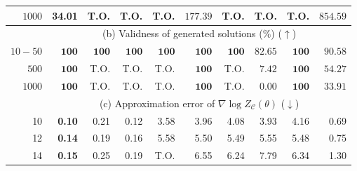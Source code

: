 \begin{table}[!t]
\begin{tabular}{r|rrrrrrrrr}
        $1000$  & \textbf{34.01}                                                                                      & T.O.           & {T.O.}         & {T.O.}         & $177.39$       & {T.O.}         & {T.O.}       & {T.O.}         & $854.59$ \\
        \hline
                & \multicolumn{9}{c}{(b) Validness of generated solutions ($\%$) ($\uparrow$)}                                                                                                                                                        \\ \hline
        $10-50$ & $\mathbf{100}$                                                                                      & $\mathbf{100}$ & $\mathbf{100}$ & $\mathbf{100}$ & $\mathbf{100}$ & $\mathbf{100}$ & $82.65$      & $\mathbf{100}$ & $90.58$  \\
        $500$   & $\mathbf{100}$                                                                                      & T.O.           & T.O.           & T.O.           & $\mathbf{100}$ & T.O.           & $7.42$       & $\mathbf{100}$ & $54.27$  \\
        $1000$  & $\mathbf{100}$                                                                                      & T.O.           & T.O.           & T.O.           & $\mathbf{100}$ & T.O.           & $0.00$       & $\mathbf{100}$ & $33.91$  \\
        \hline
                & \multicolumn{9}{c}{(c) Approximation error of  $\nabla\log Z_{\mathcal{C}}(\theta)$ ($\downarrow$)}                                                                                                                                 \\ \hline
        10      & \textbf{0.10}                                                                                       & 0.21           & 0.12           & 3.58           & 3.96           & 4.08           & 3.93         & 4.16           & 0.69     \\
        12      & \textbf{0.14}                                                                                       & 0.19           & 0.16           & 5.58           & 5.50           & 5.49           & 5.55         & 5.48           & 0.75     \\
        14      & \textbf{0.15}                                                                                       & 0.25           & 0.19           & T.O.           & 6.55           & 6.24           & 7.79         & 6.34           & 1.30     \\

\end{tabular}
\end{table}
